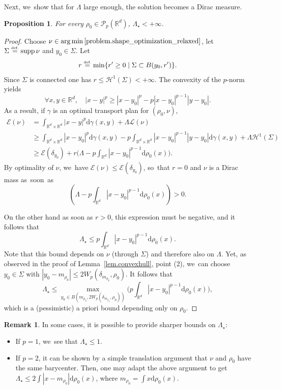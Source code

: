 \documentclass[10pt]{amsart}
\newtheorem{proposition}[theorem]{Proposition}
\theoremstyle{definition}
\newtheorem{remark}[theorem]{Remark}
\newcommand{\eqdef}{\ensuremath{\stackrel{\mbox{\upshape\tiny def.}}{=}}}
\newcommand\E{\mathcal{E}}
\newcommand\cH{\mathcal{H}}
\newcommand\cL{\mathcal{L}}
\newcommand{\RR}{\mathbb{R}}
\DeclareMathOperator*{\argmin}{arg\,min}
\DeclareMathOperator{\supp}{supp}
\newcommand\dd{\mathrm{d}}
\newcommand{\enscond}[2]{\{#1 \mid #2\} }
\newcommand{\abs}[1]{\left\lvert#1\right\rvert}
\begin{document}
Next, we~show that for $\Lambda$ large enough, the solution becomes a Dirac measure.

\begin{proposition}\label{proposition.critical_lambda_upper_bound}
For every $\rho_0 \in \mathcal{P}_p(\RR^d)$, $\Lambda_\star<+\infty$.
\end{proposition}

\begin{proof}
Choose $\nu \in \argmin \eqref{problem.shape_optimization_relaxed}$, let $\Sigma\eqdef \supp \nu$ and $y_0\in\Sigma$.
Let
\[
r\eqdef \min\enscond{r'\geq 0}{\Sigma \subset B(y_0,r')}.
\]
Since
$\Sigma$ is connected one has $r\leq \cH^1(\Sigma)<+\infty$.
The convexity of the $p$-norm yields
\begin{equation*}
\forall x,y \in \RR^d, \quad \abs{x-y}^p \geq \abs{x-y_0}^p -p\abs{x-y_0}^{p-1}\abs{y-y_0}.
\end{equation*}
As a result, if $\gamma$ is an optimal transport plan for $(\rho_0,\nu)$,
\begin{align*}
\E(\nu)&= \int_{\RR^d\times \RR^d}\abs{x-y}^p\dd \gamma(x,y)+\Lambda \cL(\nu)\\
&\geq \int_{\RR^d\times \RR^d}\abs{x-y_0}^p\dd \gamma(x,y) - p\int_{\RR^d\times \RR^d}\abs{x-y_0}^{p-1}\abs{y-y_0}\dd \gamma(x,y)+\Lambda \cH^1(\Sigma)\\
&\geq \E(\delta_{y_0})+ r \biggl(\Lambda - p\int_{\RR^d}\abs{x-y_0}^{p-1}\dd \rho_0(x) \biggr).
\end{align*}
By optimality of $\nu$, we~have $\E(\nu)\leq\E(\delta_{y_0})$, so~that $r=0$ and $\nu$ is a Dirac mass as~soon~as
\[
\left(\Lambda - p\int_{\RR^d}\abs{x-y_0}^{p-1}\dd \rho_0(x)\right)>0.
\]

On the other hand as soon as $r>0$, this expression
must be negative, and it follows that
\[
\Lambda_\star \le p\int_{\RR^d}\abs{x-y_0}^{p-1}\dd \rho_0(x).
\]
Note that this bound depends on $\nu$ (through $\Sigma$) and
therefore also on $\Lambda$.
Yet, as observed in the proof of
Lemma~\ref{lem.convexhull}, point (2), we~can choose $y_0\in\Sigma$
with $|y_0-m_{\rho_0}|\le 2W_p(\delta_{m_{\rho_0}},\rho_0)$. It follows that
\[
\Lambda_\star \le \max_{y_0
\in B(m_{\rho_0},2W_p(\delta_{m_{\rho_0}},\rho_0))}
\biggl(p\int_{\RR^d}\abs{x-y_0}^{p-1}\dd \rho_0(x) \biggr),
\]
which is a (pessimistic) a priori bound depending only on $\rho_0$.
\end{proof}

\begin{remark}
In some cases, it is possible to provide sharper bounds on $\Lambda_\star$:
\begin{itemize}
\item If $p=1$, we~see that $\Lambda_\star\leq 1$.
\item If $p=2$, it can be shown by a simple translation argument that $\nu$ and $\rho_0$ have the same barycenter. Then, one may adapt the above argument to get $\Lambda_\star \leq 2\int\abs{x-m_{\rho_0}}\dd \rho_0(x)$, where $m_{\rho_0}=\int x\dd \rho_0(x)$.
\end{itemize}
\end{remark}
\end{document}
